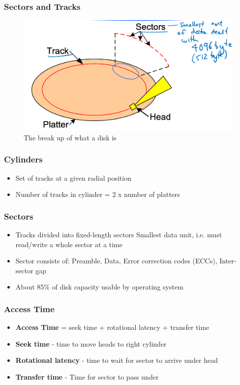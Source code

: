 \subsubsection{Sectors and Tracks}
\begin{figure}
	\centering
	\includegraphics[width=0.8\linewidth]{disk}
	\caption{The break up of what a disk is}
\end{figure}

\subsubsection{Cylinders}
\begin{itemize}
	\item Set of tracks at a given radial position
	\item Number of tracks in cylinder = 2 x number of platters
\end{itemize}

\subsubsection{Sectors}
\begin{itemize}
	\item Tracks divided into fixed-length sectors
	\subitem Smallest data unit, i.e. must read/write a whole sector at a time
	\item Sector consists of: Preamble, Data, Error correction codes (ECCs), Inter-sector gap
	\item About 85\% of disk capacity usable by operating system	
\end{itemize}

\subsubsection{Access Time}
\begin{itemize}
	\item \textbf{Access Time} = seek time + rotational latency + transfer time
	\item \textbf{Seek time} - time to move heads to right cylinder
	\item \textbf{Rotational latency} - time to wait for sector to arrive under head
	\item \textbf{Transfer time} - Time for sector to pass under	
\end{itemize}

